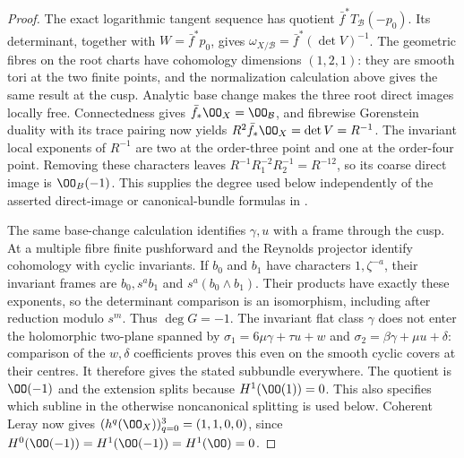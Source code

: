 \begin{proof}
The exact logarithmic tangent sequence has quotient
$\bar f^*T_{\mathcal B}(-p_0)$.  Its determinant, together with
$W=\bar f^*p_0$, gives
$\omega_{X/\mathcal B}=\bar f^*(\det V)^{-1}$.
The geometric fibres on the root charts have cohomology dimensions
$(1,2,1)$: they are smooth tori at the two finite points, and the
normalization calculation above gives the same result at the cusp.
Analytic base change makes the three root direct images locally free.
Connectedness gives $\bar f_*\OO_X=\OO_{\mathcal B}$, and fibrewise
Gorenstein duality with its trace pairing now yields
$R^2\bar f_*\OO_X=\det V=R^{-1}$.  The invariant local exponents
of $R^{-1}$ are two at the order-three point and one at the
order-four point.  Removing these characters leaves
$R^{-1}R_1^{-2}R_2^{-1}=R^{-12}$, so its coarse direct image is
$\OO_B(-1)$.  This supplies the degree used below independently of
the asserted direct-image or canonical-bundle formulas in \citet{AC2026}.

The same base-change calculation identifies $\gamma,u$ with a
frame through the cusp.  At a multiple fibre finite pushforward and the
Reynolds projector identify cohomology with cyclic invariants.  If $b_0$
and $b_1$ have characters $1,\zeta^{-a}$, their invariant frames are
$b_0,s^ab_1$ and $s^a(b_0\wedge b_1)$.  Their products have exactly
these exponents, so the determinant comparison is an isomorphism,
including after reduction modulo $s^m$.  Thus $\deg G=-1$.
The invariant flat class $\gamma$ does not enter the holomorphic
two-plane spanned by
$\sigma_1=6\mu\gamma+\tau u+w$ and
$\sigma_2=\beta\gamma+\mu u+\delta$: comparison of the $w,\delta$
coefficients proves this even on the smooth cyclic covers at their
centres.  It therefore gives the stated subbundle everywhere.
The quotient is $\OO(-1)$ and the extension splits because
$H^1(\OO(1))=0$.  This also specifies which subline in the otherwise
noncanonical splitting is used below.  Coherent Leray now gives
$(h^q(\OO_X))_{q=0}^3=(1,1,0,0)$, since
$H^0(\OO(-1))=H^1(\OO(-1))=H^1(\OO)=0$.
\end{proof}

